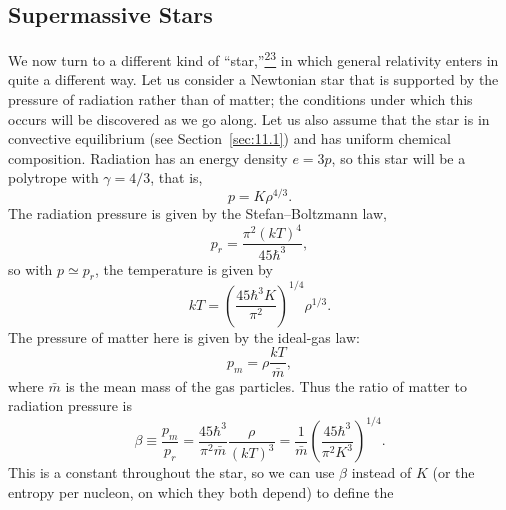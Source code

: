 
\subsection{Supermassive Stars}\label{sec:11.5}

We now turn to a different kind of
``star,''\hyperref[ch11-ref-23]{\textsuperscript{23}} in which general
relativity enters in quite a different way. Let us consider a Newtonian star
that is supported by the pressure of radiation rather than of matter; the
conditions under which this occurs will be discovered as we go along. Let us
also assume that the star is in convective equilibrium (see
Section~\ref{sec:11.1}) and has uniform chemical composition. Radiation has
an energy density \(e=3p\), so this star will be a polytrope with
\(\gamma=4/3\), that is,
\begin{equation}
  p=K\rho^{4/3}.
  \tag{11.5.1}\label{eq:11.5.1}
\end{equation}
The radiation pressure is given by the Stefan--Boltzmann law,
\begin{equation}
  p_r=\frac{\pi^2(kT)^4}{45\hbar^3},
  \tag{11.5.2}\label{eq:11.5.2}
\end{equation}
so with \(p\simeq p_r\), the temperature is given by
\begin{equation}
  kT
  =
  \left(\frac{45\hbar^3K}{\pi^2}\right)^{1/4}\rho^{1/3}.
  \tag{11.5.3}\label{eq:11.5.3}
\end{equation}
The pressure of matter here is given by the ideal-gas law:
\begin{equation}
  p_m=\rho\frac{kT}{\bar m},
  \tag{11.5.4}\label{eq:11.5.4}
\end{equation}
where \(\bar m\) is the mean mass of the gas particles. Thus the ratio of
matter to radiation pressure is
\begin{equation}
  \beta
  \equiv
  \frac{p_m}{p_r}
  =
  \frac{45\hbar^3}{\pi^2\bar m}\frac{\rho}{(kT)^3}
  =
  \frac1{\bar m}
  \left(\frac{45\hbar^3}{\pi^2K^3}\right)^{1/4}.
  \tag{11.5.5}\label{eq:11.5.5}
\end{equation}
This is a constant throughout the star, so we can use \(\beta\) instead of
\(K\) (or the entropy per nucleon, on which they both depend) to define the
